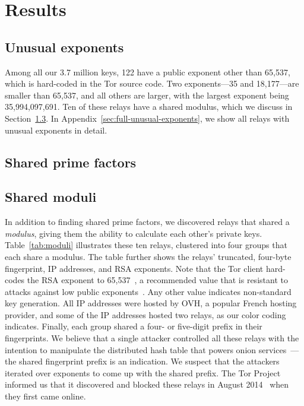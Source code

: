 \section{Results}

\subsection{Unusual exponents}
\label{sec:unusual-exponents}
Among all our 3.7 million keys, 122 have a public exponent other than 65,537,
which is hard-coded in the Tor source code.  Two exponents---35 and 18,177---are
smaller than 65,537, and all others are larger, with the largest exponent being
35,994,097,691.  Ten of these relays have a shared modulus, which we discuss in
Section~\ref{sec:shared-moduli}.  In Appendix~\ref{sec:full-unusual-exponents},
we show all relays with unusual exponents in detail.


\subsection{Shared prime factors}

\subsection{Shared moduli}
\label{sec:shared-moduli}
In addition to finding shared prime factors, we discovered relays that shared a
\emph{modulus}, giving them the ability to calculate each other's private keys.
Table~\ref{tab:moduli} illustrates these ten relays, clustered into four groups
that each share a modulus.  The table further shows the relays' truncated,
four-byte fingerprint, IP addresses, and RSA exponents.  Note that the Tor
client hard-codes the RSA exponent to 65,537~\cite[\S~0.3]{torspec}, a
recommended value that is resistant to attacks against low public
exponents~\cite[\S~4]{Boneh1999a}.  Any other value indicates non-standard key
generation.  All IP addresses were hosted by OVH, a popular French hosting
provider, and some of the IP addresses hosted two relays, as our color coding
indicates.  Finally, each group shared a four- or five-digit prefix in their
fingerprints.  We believe that a single attacker controlled all these relays
with the intention to manipulate the distributed hash table that powers onion
services~\cite{Biryukov2013a}---the shared fingerprint prefix is an indication.
We suspect that the attackers iterated over exponents to come up with the shared
prefix.  The Tor Project informed us that it discovered and blocked these relays
in August 2014~\cite{tor-priv1} when they first came online.

